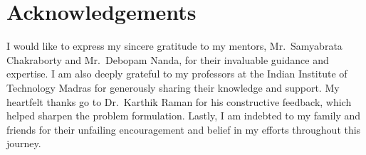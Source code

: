 \chapter*{Acknowledgements}
\begin{doublespacing}
I would like to express my sincere gratitude to my mentors, Mr.~Samyabrata Chakraborty and Mr.~Debopam Nanda, for their invaluable guidance and expertise. I am also deeply grateful to my professors at the Indian Institute of Technology Madras for generously sharing their knowledge and support. My heartfelt thanks go to Dr.~Karthik Raman for his constructive feedback, which helped sharpen the problem formulation. Lastly, I am indebted to my family and friends for their unfailing encouragement and belief in my efforts throughout this journey.
\end{doublespacing}